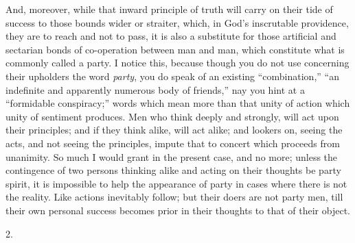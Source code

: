 And, moreover, while that inward principle of
truth will carry on their tide of success to those bounds wider or
straiter, which, in God's inscrutable providence, they are to reach
and not to pass, it is also a substitute for those artificial and
sectarian bonds of co-operation between man and man, which constitute
what is commonly called a party. I notice this, because though you do
not use concerning their upholders the word \emph{party}, you do speak
of an existing ``combination,'' ``an indefinite and apparently
numerous body of friends,'' nay you hint at a ``formidable
conspiracy;'' words which mean more than that unity of action which
unity of sentiment produces. Men who think deeply and strongly, will
act upon their principles; and if they think alike, will act alike;
and lookers on, seeing the acts, and not seeing the principles, impute
that to concert which proceeds from unanimity. So much I would grant
in the present case, and no more; unless the contingence of two
persons thinking alike and acting on their thoughts be party
spirit, it is impossible to help the appearance of party in cases
where there is not the reality. Like actions inevitably follow; but
their doers are not party men, till their own personal success becomes
prior in their thoughts to that of their object.

2.

